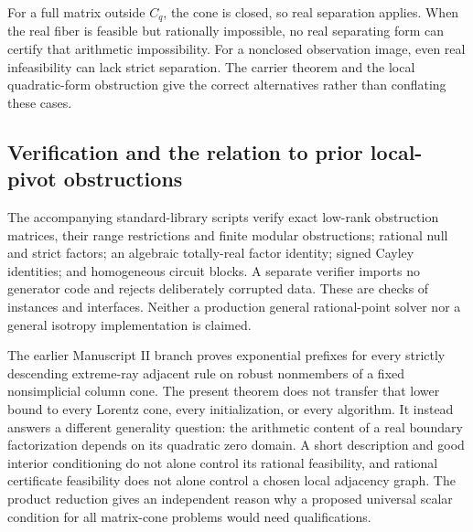 For a full matrix outside $C_q$, the cone is closed, so real separation applies. When the real fiber is feasible but rationally impossible, no real separating form can certify that arithmetic impossibility. For a nonclosed observation image, even real infeasibility can lack strict separation. The carrier theorem and the local quadratic-form obstruction give the correct alternatives rather than conflating these cases.

\subsection{Verification and the relation to prior local-pivot obstructions}
The accompanying standard-library scripts verify exact low-rank obstruction matrices, their range restrictions and finite modular obstructions; rational null and strict factors; an algebraic totally-real factor identity; signed Cayley identities; and homogeneous circuit blocks. A separate verifier imports no generator code and rejects deliberately corrupted data. These are checks of instances and interfaces. Neither a production general rational-point solver nor a general isotropy implementation is claimed.

The earlier Manuscript II branch proves exponential prefixes for every strictly descending extreme-ray adjacent rule on robust nonmembers of a fixed nonsimplicial column cone. The present theorem does not transfer that lower bound to every Lorentz cone, every initialization, or every algorithm. It instead answers a different generality question: the arithmetic content of a real boundary factorization depends on its quadratic zero domain. A short description and good interior conditioning do not alone control its rational feasibility, and rational certificate feasibility does not alone control a chosen local adjacency graph. The product reduction gives an independent reason why a proposed universal scalar condition for all matrix-cone problems would need qualifications.
